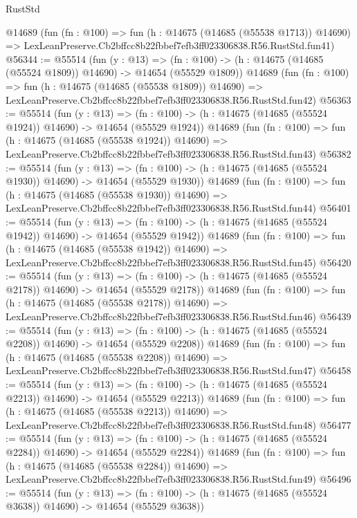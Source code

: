 \begin{lexlean}{RustStd}
\begin{coremodule}
    @14689
    (fun (fn : @100) =>
    fun (h : @14675 (@14685 (@55538 @1713)) @14690) =>
    LexLeanPreserve.Cb2bffcc8b22fbbef7efb3ff023306838.R56.RustStd.fun41)
@56344 := @55514
    (fun (y : @13) =>
    (fn : @100) -> (h : @14675 (@14685 (@55524 @1809)) @14690) -> @14654 (@55529 @1809))
    @14689
    (fun (fn : @100) =>
    fun (h : @14675 (@14685 (@55538 @1809)) @14690) =>
    LexLeanPreserve.Cb2bffcc8b22fbbef7efb3ff023306838.R56.RustStd.fun42)
@56363 := @55514
    (fun (y : @13) =>
    (fn : @100) -> (h : @14675 (@14685 (@55524 @1924)) @14690) -> @14654 (@55529 @1924))
    @14689
    (fun (fn : @100) =>
    fun (h : @14675 (@14685 (@55538 @1924)) @14690) =>
    LexLeanPreserve.Cb2bffcc8b22fbbef7efb3ff023306838.R56.RustStd.fun43)
@56382 := @55514
    (fun (y : @13) =>
    (fn : @100) -> (h : @14675 (@14685 (@55524 @1930)) @14690) -> @14654 (@55529 @1930))
    @14689
    (fun (fn : @100) =>
    fun (h : @14675 (@14685 (@55538 @1930)) @14690) =>
    LexLeanPreserve.Cb2bffcc8b22fbbef7efb3ff023306838.R56.RustStd.fun44)
@56401 := @55514
    (fun (y : @13) =>
    (fn : @100) -> (h : @14675 (@14685 (@55524 @1942)) @14690) -> @14654 (@55529 @1942))
    @14689
    (fun (fn : @100) =>
    fun (h : @14675 (@14685 (@55538 @1942)) @14690) =>
    LexLeanPreserve.Cb2bffcc8b22fbbef7efb3ff023306838.R56.RustStd.fun45)
@56420 := @55514
    (fun (y : @13) =>
    (fn : @100) -> (h : @14675 (@14685 (@55524 @2178)) @14690) -> @14654 (@55529 @2178))
    @14689
    (fun (fn : @100) =>
    fun (h : @14675 (@14685 (@55538 @2178)) @14690) =>
    LexLeanPreserve.Cb2bffcc8b22fbbef7efb3ff023306838.R56.RustStd.fun46)
@56439 := @55514
    (fun (y : @13) =>
    (fn : @100) -> (h : @14675 (@14685 (@55524 @2208)) @14690) -> @14654 (@55529 @2208))
    @14689
    (fun (fn : @100) =>
    fun (h : @14675 (@14685 (@55538 @2208)) @14690) =>
    LexLeanPreserve.Cb2bffcc8b22fbbef7efb3ff023306838.R56.RustStd.fun47)
@56458 := @55514
    (fun (y : @13) =>
    (fn : @100) -> (h : @14675 (@14685 (@55524 @2213)) @14690) -> @14654 (@55529 @2213))
    @14689
    (fun (fn : @100) =>
    fun (h : @14675 (@14685 (@55538 @2213)) @14690) =>
    LexLeanPreserve.Cb2bffcc8b22fbbef7efb3ff023306838.R56.RustStd.fun48)
@56477 := @55514
    (fun (y : @13) =>
    (fn : @100) -> (h : @14675 (@14685 (@55524 @2284)) @14690) -> @14654 (@55529 @2284))
    @14689
    (fun (fn : @100) =>
    fun (h : @14675 (@14685 (@55538 @2284)) @14690) =>
    LexLeanPreserve.Cb2bffcc8b22fbbef7efb3ff023306838.R56.RustStd.fun49)
@56496 := @55514
    (fun (y : @13) =>
    (fn : @100) -> (h : @14675 (@14685 (@55524 @3638)) @14690) -> @14654 (@55529 @3638))

\end{coremodule}
\end{lexlean}
